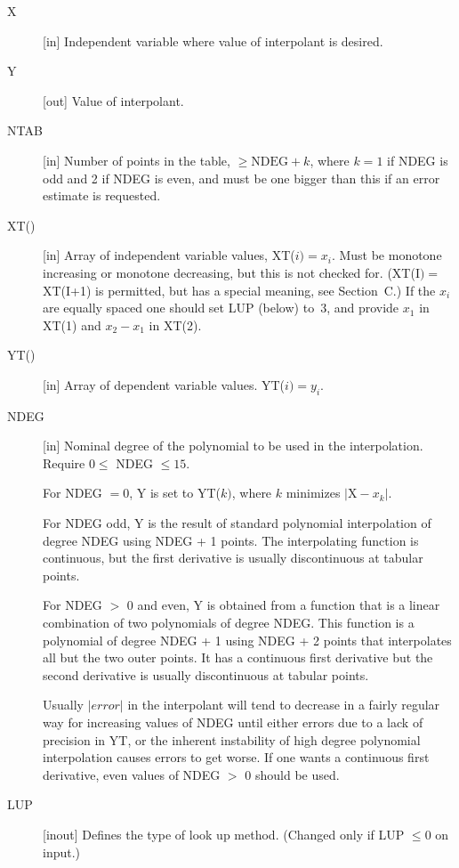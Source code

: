 \documentclass[twoside]{MATH77}
\begin{document}
\begin{description}
\item[X]  [in] Independent variable where value of interpolant is desired.

\item[Y]  [out] Value of interpolant.

\item[NTAB]  [in] Number of points in the table, $\geq \text{NDEG}+k$,
  where $k=1$ if NDEG is odd and 2 if NDEG is even, and must be one
  bigger than this if an error estimate is requested.

\item[XT()]  [in] Array of independent variable values, XT($i)=x_i$. Must be
monotone increasing or monotone decreasing, but this is not checked
for. (XT(I$)=$ XT(I+1) is permitted, but has a special meaning, see
Section~C.) If the $x_i$ are equally spaced one should set LUP (below) to~3,
and provide $x_1$ in XT(1) and $x_2-x_1$ in XT(2).

\item[YT()]  [in] Array of dependent variable values. YT($i)=y_i.$

\item[NDEG]  [in] Nominal degree of the polynomial to be used in the
interpolation. Require $0\leq $ NDEG $\leq 15.$

For NDEG $=0$, Y is set to YT($k)$, where $k$ minimizes $|\text{X} -x_k|.$

For NDEG odd, Y is the result of standard polynomial interpolation of degree
NDEG using NDEG + 1 points. The interpolating function is continuous, but
the first derivative is usually discontinuous at tabular points.

For NDEG $>$ 0 and even, Y is obtained from a function that is a linear
combination of two polynomials of degree NDEG. This function is a polynomial
of degree NDEG + 1 using NDEG + 2 points that interpolates all but the two
outer points. It has a continuous first derivative but the second derivative
is usually discontinuous at tabular points.

Usually $|error|$ in the interpolant will tend to decrease in a fairly
regular way for increasing values of NDEG until either errors due to a lack
of precision in YT, or the inherent instability of high degree polynomial
interpolation causes errors to get worse. If one wants a continuous first
derivative, even values of NDEG $>$ 0 should be used.

\item[LUP]  [inout] Defines the type of look up method. (Changed only if LUP
$\leq 0$ on input.)


\end{description}
\end{document}
